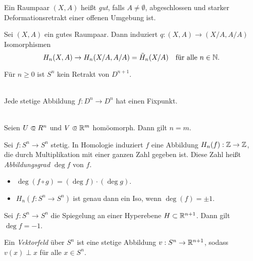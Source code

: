 \documentclass{cheat-sheet}
\newcommand{\RH}{\tilde{H}} %
\begin{document}
\begin{defn}
  Ein Raumpaar $(X, A)$ heißt \emph{gut}, falls $A \not= \emptyset$, abgeschlossen und starker Deformationsretrakt einer offenen Umgebung ist.
\end{defn}

\begin{prop}
  Sei $(X, A)$ ein gutes Raumpaar. Dann induziert $q : (X, A) \to (X/A, A/A)$ Isomorphismen
  \[ H_n(X, A) \to H_n(X/A, A/A) = \RH_n(X/A) \quad \text{für alle $n \in \N$.} \]
\end{prop}

\begin{satz}
  Für $n \geq 0$ ist $S^n$ kein Retrakt von $D^{n+1}$.
\end{satz}

\begin{kor}\mbox{}\\
  Jede stetige Abbildung $f : D^n \to D^n$ hat einen Fixpunkt.
\end{kor}

\begin{satz}\mbox{}\\
  Seien $U \opn R^n$ und $V \opn \R^m$ homöomorph. Dann gilt $n = m$.
\end{satz}


\begin{defn}
  Sei $f : S^n \to S^n$ stetig. In Homologie induziert $f$ eine Abbildung $H_n(f) : \mathbb{Z} \to \mathbb{Z}$, die durch Multiplikation mit einer ganzen Zahl gegeben ist. Diese Zahl heißt \emph{Abbildungsgrad} $\deg f$ von $f$.
\end{defn}

\begin{beob}
  \begin{itemize}
    \item $\deg (f \circ g) = (\deg f) \cdot (\deg g)$.
    \item $H_n(f : S^n \to S^n)$ ist genau dann ein Iso, wenn $\deg(f) = \pm 1$.
  \end{itemize}
\end{beob}

\begin{prop}
  Sei $f : S^n \to S^n$ die Spiegelung an einer Hyperebene $H \subset \mathbb{R}^{n+1}$. Dann gilt $\deg f = -1$.
\end{prop}

\begin{defn}
  Ein \emph{Vektorfeld} über $S^n$ ist eine stetige Abbildung $v : S^n \to \mathbb{R}^{n+1}$, sodass $v(x) \perp x$ für alle $x \in S^n$.
\end{defn}
\end{document}
